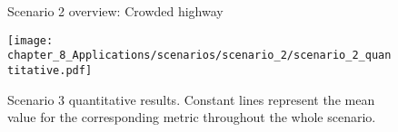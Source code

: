 
\begin{figure}[]
	\centering
	\caption{Scenario 2 overview: Crowded highway}
	\label{fig:chapter_8_Applications/scenarios/scenario_2/scenario_2_route15_town04_testing}
\end{figure}

\begin{figure}[]
	\centering
	\texttt{[image: chapter\_8\_Applications/scenarios/scenario\_2/scenario\_2\_quantitative.pdf]}
	\captionsetup{justification=justified}
	\caption[Scenario 2 quantitative results]{Scenario 3 quantitative results. Constant lines represent the mean value for the corresponding metric throughout the whole scenario.}
	\label{fig:chapter_8_Applications/scenarios/scenario_2/scenario_2_quantitative}
\end{figure}

